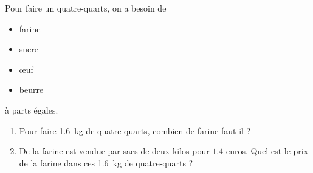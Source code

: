 
\begin{rituel}
    Pour faire un quatre-quarts, on a besoin de
    \begin{itemize}
        \item farine
        \item sucre
        \item œuf
        \item beurre
    \end{itemize}
    à parts égales.

    \begin{enumerate}
        \item
            Pour faire \SI{1.6}{\kilo\gram} de quatre-quarts, combien de farine faut-il ?
        \item
            De la farine est vendue par sacs de deux kilos pour \( 1.4\) euros. Quel est le prix de la farine dans ces \SI{1.6}{\kilo\gram} de quatre-quarts ?
    \end{enumerate}
\end{rituel}
